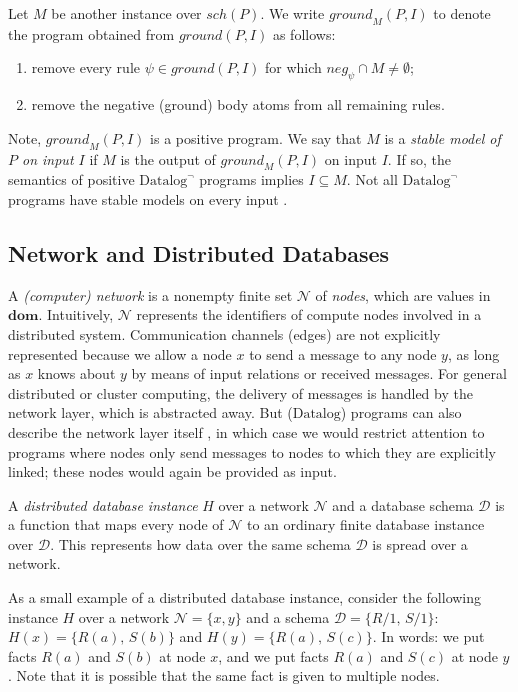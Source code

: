 \documentclass{tlp}
\newcommand{\langname}[1]{\text{#1}}  \newcommand{\pred}[1]{\mathtt{#1}}  \newcommand{\fname}[1]{\mathit{#1}}  \newcommand{\sq}[1]{`{#1}'}
\newcommand{\datalogneg}{\langname{Datalog}^{\neg}}
\newcommand{\datalog}{\langname{Datalog}}
\newcommand{\rar}[2]{#1/#2}
\newcommand{\sch}{\mathcal{D}}
\newcommand{\univ}{\mathbf{dom}}
\newcommand{\bneg}[1]{\fname{neg}_{#1}}
\newcommand{\schof}[1]{\fname{sch}(#1)}
\newcommand{\grl}{\psi}
\newcommand{\gr}[2]{\fname{ground}(#1,#2)}
\newcommand{\grp}[3]{\fname{ground}_{#1}(#2,#3)}
\newcommand{\nw}{\mathcal{N}}
\begin{document}
Let $M$ be another instance over $\schof P$. We write $\grp MPI$
to denote the program\emph{ }obtained from $\gr PI$ as follows:
\begin{enumerate}
\item remove every rule $\grl\in\gr PI$ for which $\bneg{\grl}\cap M\neq\emptyset$;
\item remove the negative (ground) body atoms from all remaining rules.
\end{enumerate}
Note, $\grp MPI$ is a positive program. We say that $M$ is a \emph{stable
model of $P$ on input $I$} if $M$ is the output of $\grp MPI$
on input $I$. If so, the semantics of positive $\datalogneg$ programs
implies $I\subseteq M$. Not all $\datalogneg$ programs have stable
models on every input \cite{gelfond_stable}.


\subsection{Network and Distributed Databases}

\label{sub:network-and-distributed-database}

A \emph{(computer) network} is a nonempty finite set $\nw$ of \emph{nodes},
which are values in $\univ$. Intuitively, $\nw$ represents the identifiers
of compute nodes involved in a distributed system. Communication channels
(edges) are not explicitly represented because we allow a node $x$
to send a message to any node $y$, as long as $x$ knows about $y$
by means of input relations or received messages. For general distributed
or cluster computing, the delivery of messages is handled by the network
layer, which is abstracted away. But ($\datalog$) programs can also
describe the network layer itself \cite{decl_netw_cacm,hellerstein_declimp},
in which case we would restrict attention to programs where nodes
only send messages to nodes to which they are explicitly linked; these
nodes would again be provided as input.

A \emph{distributed database instance} $H$ over a network $\nw$
and a database schema $\sch$ is a function that maps every node of
$\nw$ to an ordinary finite database instance over $\sch$. This
represents how data over the same schema $\sch$ is spread over a
network.

As a small example of a distributed database instance, consider the
following instance $H$ over a network $\nw=\{x,y\}$ and a schema
$\sch=\{\rar R1,\,\rar S1\}$: $H(x)=\{R(a),\, S(b)\}$ and $H(y)=\{R(a),\,S(c)\}$.
In words: we put facts $R(a)$ and $S(b)$ at node $x$, and we put facts $R(a)$ and $S(c)$ at node $y$. 
Note that it is possible that the same fact is given to multiple nodes.
\end{document}
